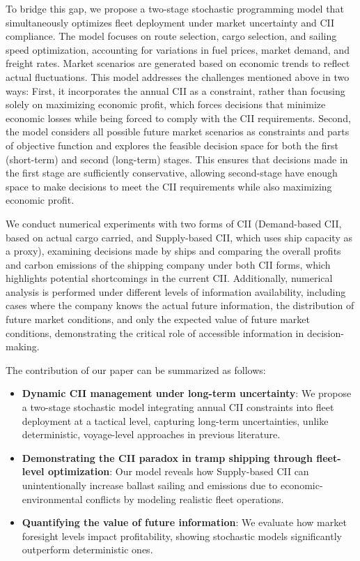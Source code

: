 \documentclass[11pt,english]{article}
\begin{document}
To bridge this gap, we propose a two-stage stochastic programming model that simultaneously optimizes fleet deployment under market uncertainty and CII compliance. The model focuses on route selection, cargo selection, and sailing speed optimization, accounting for variations in fuel prices, market demand, and freight rates. Market scenarios are generated based on economic trends to reflect actual fluctuations. This model addresses the challenges mentioned above in two ways: First, it incorporates the annual CII as a constraint, rather than focusing solely on maximizing economic profit, which forces decisions that minimize economic losses while being forced to comply with the CII requirements. Second, the model considers all possible future market scenarios as constraints and parts of objective function and explores the feasible decision space for both the first (short-term) and second (long-term) stages. This ensures that decisions made in the first stage are sufficiently conservative, allowing second-stage have enough space to make decisions to meet the CII requirements while also maximizing economic profit.

We conduct numerical experiments with two forms of CII (Demand-based CII, based on actual cargo carried, and Supply-based CII, which uses ship capacity as a proxy), examining decisions made by ships and comparing the overall profits and carbon emissions of the shipping company under both CII forms, which highlights potential shortcomings in the current CII. Additionally, numerical analysis is performed under different levels of information availability, including cases where the company knows the actual future information, the distribution of future market conditions, and only the expected value of future market conditions, demonstrating the critical role of accessible information in decision-making.

The contribution of our paper can be summarized as follows:

\begin{itemize}
    \label{sec:contribution}
    \item \textbf{Dynamic CII management under long-term uncertainty}: We propose a two-stage stochastic model integrating annual CII constraints into fleet deployment at a tactical level, capturing long-term uncertainties, unlike deterministic, voyage-level approaches in previous literature.
    \item \textbf{Demonstrating the CII paradox in tramp shipping through fleet-level optimization}: Our model reveals how Supply-based CII can unintentionally increase ballast sailing and emissions due to economic-environmental conflicts by modeling realistic fleet operations.
    \item \textbf{Quantifying the value of future information}: We evaluate how market foresight levels impact profitability, showing stochastic models significantly outperform deterministic ones.
\end{itemize}
\end{document}
